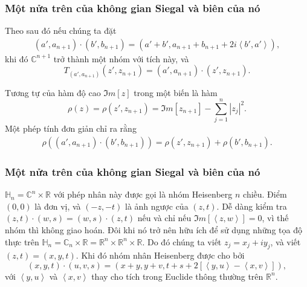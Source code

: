 \documentclass[11pt]{beamer}
\numberwithin{equation}{section}
\theoremstyle{plain}
\theoremstyle{definition}
\theoremstyle{remark}
\begin{document}
\begin{frame}\frametitle{Một nửa trên của không gian Siegal và biên của nó}

Theo sau đó nếu chúng ta đặt
\begin{align}\label{62}
\left( {a',{a_{n + 1}}} \right) \cdot \left( {b',{b_{n + 1}}} \right) = \left( {a' + b',{a_{n + 1}} + {b_{n + 1}} + 2i\left\langle {b',a'} \right\rangle } \right),
\end{align}
khi đó $\mathbb{C}^{n+1}$ trở thành một nhóm với tích này, và 
\[{T_{\left( {a',{a_{n + 1}}} \right)}}\left( {z',{z_{n + 1}}} \right) = \left( {a',{a_{n + 1}}} \right) \cdot \left( {z',{z_{n + 1}}} \right).\]

Tương tự của hàm độ cao $\Im m\left[ z \right]$ trong một biến là hàm
\[\rho \left( z \right) = \rho \left( {z',{z_{n + 1}}} \right) = \Im m\left[ {{z_{n + 1}}} \right] - \sum\limits_{j = 1}^n {{{\left| {{z_j}} \right|}^2}} .\]
Một phép tính đơn giản chỉ ra rằng
\begin{align}\label{63}
\rho \left( {\left( {a',{a_{n + 1}}} \right) \cdot \left( {b',{b_{n + 1}}} \right)} \right) = \rho \left( {z',{z_{n + 1}}} \right) + \rho \left( {b',{b_{n + 1}}} \right).
\end{align}
\end{frame}







\begin{frame}\frametitle{Một nửa trên của không gian Siegal và biên của nó}
$\mathbb{H}_{n}=\mathbb{C}^{n}\times\mathbb{R}$ với phép nhân này được gọi là nhóm Heisenberg $n$ chiều. Điểm $\left(0,0\right)$ là đơn vị, và $\left(-z,-t\right)$ là ảnh ngược của $\left(z,t\right)$. Dễ dàng kiểm tra $\left( {z,t} \right) \cdot \left( {w,s} \right) = \left( {w,s} \right) \cdot \left( {z,t} \right)$ nếu và chỉ nếu $\Im m\left[ {\left\langle {z,w} \right\rangle } \right] = 0$, vì thế nhóm thì không giao hoán. Đôi khi nó trở nên hữu ích để sử dụng những tọa độ thực trên $\mathbb{H}_{n}=\mathbb{C}_{n}\times\mathbb{R}=\mathbb{R}^{n}\times\mathbb{R}^{n}\times\mathbb{R}$. Do đó chúng ta viết ${z_j} = {x_j} + i{y_j}$, và viết $\left( {z,t} \right) = \left( {x,y,t} \right)$. Khi đó nhóm nhân Heisenberg được cho bởi
\[\left( {x,y,t} \right) \cdot \left( {u,v,s} \right) = \left( {x + y,y + v,t + s + 2\left[ {\left\langle {y,u} \right\rangle  - \left\langle {x,v} \right\rangle } \right]} \right),\]
với ${\left\langle {y,u} \right\rangle }$ và ${\left\langle {x,v} \right\rangle }$ thay cho tích trong Euclide thông thường trên $\mathbb{R}^{n}$.
\end{frame}
\end{document}
